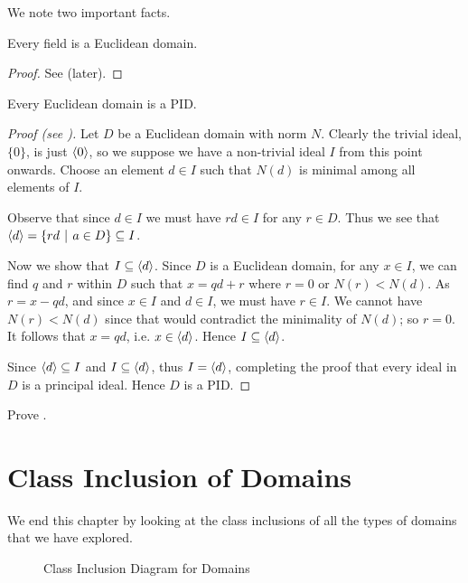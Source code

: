 We note two important facts.

\begin{theorem}\label{thrm-field-is-euclidean-domain}
    Every field is a Euclidean domain.
\end{theorem}
\begin{proof}
    See  (later).
\end{proof}

\begin{theorem}\label{thrm-euclidean-domain-is-PID}
    Every Euclidean domain is a PID.
\end{theorem}
\begin{proof}[Proof (see {\cite[Theorem 18.4]{gallian_2016}})]
    Let $D$ be a Euclidean domain with norm $N$. Clearly the trivial ideal, $\{0\}$, is just $\left\langle0\right\rangle$, so we suppose we have a non-trivial ideal $I$ from this point onwards. Choose an element $d \in I$ such that $N(d)$ is minimal among all elements of $I$.

    Observe that since $d \in I$ we must have $rd \in I$ for any $r \in D$. Thus we see that $\princ{d} = \left\{rd \vert a \in D\right\} \subseteq I$.

    Now we show that $I \subseteq \left\langle d\right\rangle$. Since $D$ is a Euclidean domain, for any $x \in I$, we can find $q$ and $r$ within $D$ such that $x = qd + r$ where $r = 0$ or $N(r) < N(d)$. As $r = x - qd$, and since $x \in I$ and $d \in I$, we must have $r \in I$. We cannot have $N(r) < N(d)$ since that would contradict the minimality of $N(d)$; so $r = 0$. It follows that $x = qd$, i.e. $x \in \left\langle d\right\rangle$. Hence $I \subseteq \left\langle d\right\rangle$.

    Since $\left\langle d\right\rangle \subseteq I$ and $I \subseteq \left\langle d\right\rangle$, thus $I = \left\langle d\right\rangle$, completing the proof that every ideal in $D$ is a principal ideal. Hence $D$ is a PID.
\end{proof}

\begin{exercise}\label{exercise-field-is-euclidean-domain}
    Prove .
\end{exercise}

\section{Class Inclusion of Domains}
We end this chapter by looking at the class inclusions of all the types of domains that we have explored.

\begin{figure}[h]
    \centering
    \caption{Class Inclusion Diagram for Domains}\label{figure-domain-class-inclusion}
\end{figure}

